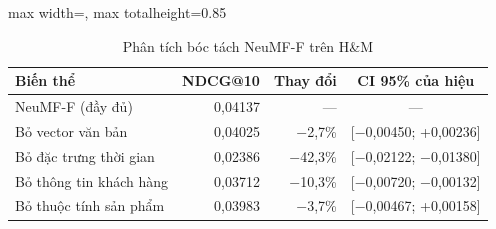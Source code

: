 \begin{table}[H]
    \centering\small
    \caption{Phân tích bóc tách NeuMF-F trên H\&M}
    \label{tab:v2ablation}
    \begin{adjustbox}{max width=\textwidth, max totalheight=0.85\textheight}
    \begin{tabular}{|l|r|r|c|}
        \hline
        Biến thể & NDCG@10 & Thay đổi & CI 95\% của hiệu \\ \hline
        NeuMF-F (đầy đủ) & 0{,}04137 & --- & --- \\ \hline
        Bỏ vector văn bản & 0{,}04025 & $-$2{,}7\% & [$-$0{,}00450; +0{,}00236] \\ \hline
        Bỏ đặc trưng thời gian & 0{,}02386 & $-$42{,}3\% & [$-$0{,}02122; $-$0{,}01380] \\ \hline
        Bỏ thông tin khách hàng & 0{,}03712 & $-$10{,}3\% & [$-$0{,}00720; $-$0{,}00132] \\ \hline
        Bỏ thuộc tính sản phẩm & 0{,}03983 & $-$3{,}7\% & [$-$0{,}00467; +0{,}00158] \\ \hline
    \end{tabular}
    \end{adjustbox}
\end{table}
